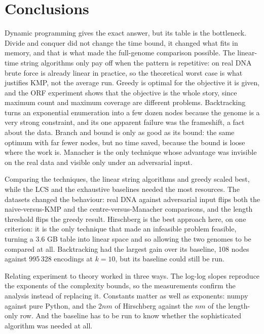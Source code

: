 \section{Conclusions}\label{sec:conclusions}

Dynamic programming gives the exact answer, but its table is the bottleneck. Divide and conquer did
not change the time bound, it changed what fits in memory, and that is what made the full-genome
comparison possible. The linear-time string algorithms only pay off when the pattern is repetitive:
on real DNA brute force is already linear in practice, so the theoretical worst case is what
justifies KMP, not the average run. Greedy is optimal for the objective it is given, and the
ORF experiment shows that the objective is the whole story, since maximum count and maximum coverage
are different problems. Backtracking turns an exponential enumeration into a few dozen nodes because
the genome is a very strong constraint, and its one apparent failure was the frameshift, a fact about
the data. Branch and bound is only as good as its bound: the same optimum with far fewer nodes, but
no time saved, because the bound is loose where the work is. Manacher is the only technique whose
advantage was invisible on the real data and visible only under an adversarial input.

Comparing the techniques, the linear string algorithms and greedy scaled best, while the LCS and the exhaustive
baselines needed the most resources. The datasets changed the behaviour: real DNA against adversarial
input flips both the naive-versus-KMP and the centre-versus-Manacher comparisons, and the length
threshold flips the greedy result. Hirschberg is the best approach here, on one criterion: it is the
only technique that made an infeasible problem feasible, turning a 3.6 GB table into linear space and
so allowing the two genomes to be compared at all. Backtracking had the largest gain over its
baseline, 108 nodes against 995\,328 encodings at $k = 10$, but its baseline could still be run.

Relating experiment to theory worked in three ways. The log-log slopes reproduce the exponents of
the complexity bounds, so the measurements confirm the analysis instead of replacing it. Constants
matter as well as exponents: numpy against pure Python, and the $2nm$ of Hirschberg against the $nm$
of the length-only row. And the baseline has to be run to know whether the sophisticated algorithm
was needed at all.
